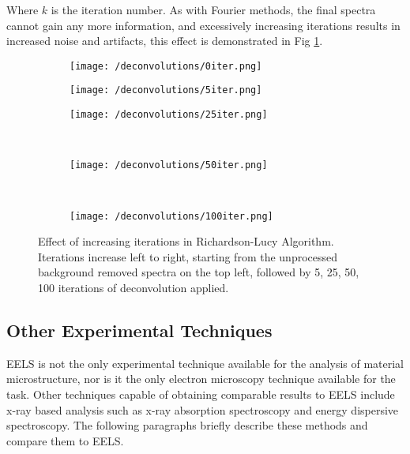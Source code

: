 Where $k$ is the iteration number.  As with Fourier methods, the final spectra cannot gain any more information, and excessively increasing iterations results in increased noise and artifacts, this effect is demonstrated in Fig \ref{RL_iter}.  

\begin{figure}

	\begin{subfigure}{0.3 \textwidth}
		\texttt{[image: /deconvolutions/0iter.png]}
	\end{subfigure}
	\hfill
	\begin{subfigure}{0.3 \textwidth}
		\texttt{[image: /deconvolutions/5iter.png]}
	\end{subfigure}
	\hfill
	\begin{subfigure}{0.3 \textwidth}
		\texttt{[image: /deconvolutions/25iter.png]}
	\end{subfigure}
	\\
	\begin{subfigure}{0.33 \textwidth}
		
		\texttt{[image: /deconvolutions/50iter.png]}
	\end{subfigure}
	~
	\begin{subfigure}{0.33 \textwidth}
		
		\texttt{[image: /deconvolutions/100iter.png]}
	\end{subfigure}

	\begin{subfigure}{0.33 \textwidth}
	\end{subfigure}

	\caption{Effect of increasing iterations in Richardson-Lucy Algorithm.  Iterations increase left to right, starting from the unprocessed background removed spectra on the top left, followed by 5, 25, 50, 100 iterations of deconvolution applied.  }
	\label{RL_iter}
\end{figure}


\subsection{Other Experimental Techniques}
EELS is not the only experimental technique available for the analysis of material microstructure, nor is it  the only electron microscopy technique available for the task. Other techniques capable of obtaining  comparable results to EELS include x-ray based analysis such as x-ray absorption spectroscopy and energy dispersive spectroscopy.  The following paragraphs briefly describe these methods and compare them to EELS.

